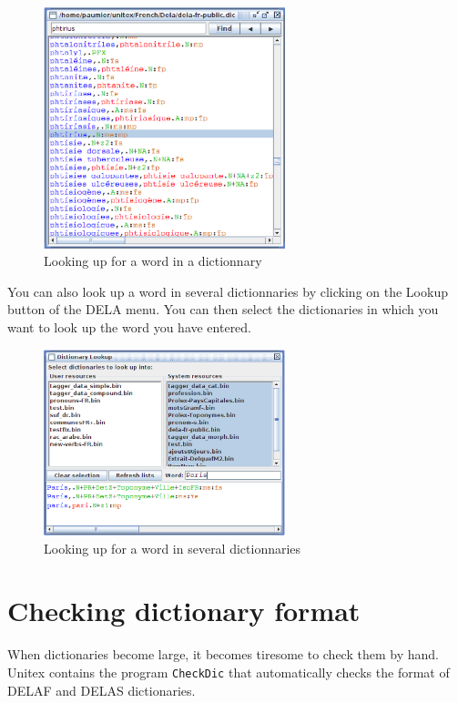 \begin{figure}[h!]
\begin{center}
\includegraphics[width=7cm]{resources/img/fig3-2.png}
\caption{Looking up for a word in a dictionnary}
\end{center}
\end{figure}

\bigskip
\noindent
You can also look up a word in several dictionnaries by clicking on the Lookup button of the DELA menu. You can then select the dictionaries in which you want to look up the word you have entered.

\begin{figure}[h!]
\begin{center}
\includegraphics[width=7cm]{resources/img/fig3-3.png}
\caption{Looking up for a word in several dictionnaries}
\end{center}
\end{figure}

\bigskip
\noindent

\section{Checking dictionary format}
 
When dictionaries become large, it becomes tiresome to check them by hand.
Unitex contains the program \verb+CheckDic+ that automatically checks the
format of DELAF and DELAS dictionaries.

